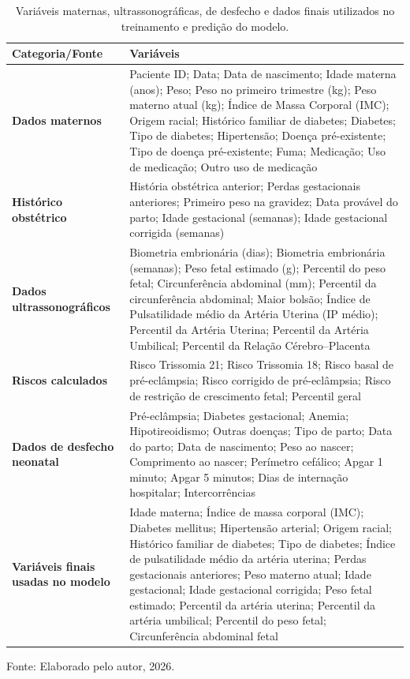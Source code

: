 \documentclass[12pt, a4paper]{report}
\theoremstyle{definition}
\theoremstyle{remark}
\theoremstyle{plain}
\begin{document}
\begin{table}[H]
\centering
\caption{Variáveis maternas, ultrassonográficas, de desfecho e dados finais utilizados no treinamento e predição do modelo.}
\small

\begin{tabularx}{\textwidth}{
  >{\RaggedRight\arraybackslash}p{3.5cm}
  >{\RaggedRight\arraybackslash}X
}
\hline
\textbf{Categoria/Fonte} & \textbf{Variáveis} \\
\hline

\textbf{Dados maternos} &
Paciente ID; Data; Data de nascimento; Idade materna (anos); Peso; Peso no primeiro trimestre (kg);
Peso materno atual (kg); Índice de Massa Corporal (IMC); Origem racial; 
Histórico familiar de diabetes; Diabetes; Tipo de diabetes; Hipertensão; 
Doença pré-existente; Tipo de doença pré-existente; Fuma; Medicação; Uso de medicação; Outro uso de medicação \\
\hline

\textbf{Histórico obstétrico} &
História obstétrica anterior; Perdas gestacionais anteriores; 
Primeiro peso na gravidez; Data provável do parto; Idade gestacional (semanas); 
Idade gestacional corrigida (semanas) \\
\hline

\textbf{Dados ultrassonográficos} &
Biometria embrionária (dias); Biometria embrionária (semanas);
Peso fetal estimado (g); Percentil do peso fetal;
Circunferência abdominal (mm); Percentil da circunferência abdominal;
Maior bolsão;
Índice de Pulsatilidade médio da Artéria Uterina (IP médio);
Percentil da Artéria Uterina;
Percentil da Artéria Umbilical;
Percentil da Relação Cérebro--Placenta \\
\hline

\textbf{Riscos calculados} &
Risco Trissomia 21; Risco Trissomia 18;
Risco basal de pré-eclâmpsia; Risco corrigido de pré-eclâmpsia;
Risco de restrição de crescimento fetal; Percentil geral \\
\hline

\textbf{Dados de desfecho neonatal} &
Pré-eclâmpsia; Diabetes gestacional; Anemia; Hipotireoidismo; Outras doenças;
Tipo de parto; Data do parto; Data de nascimento;
Peso ao nascer; Comprimento ao nascer; Perímetro cefálico;
Apgar 1 minuto; Apgar 5 minutos;
Dias de internação hospitalar; Intercorrências \\
\hline

\textbf{Variáveis finais usadas no modelo} &
Idade materna; Índice de massa corporal (IMC); Diabetes mellitus;
Hipertensão arterial; Origem racial;
Histórico familiar de diabetes; Tipo de diabetes;
Índice de pulsatilidade médio da artéria uterina;
Perdas gestacionais anteriores; Peso materno atual;
Idade gestacional; Idade gestacional corrigida;
Peso fetal estimado; Percentil da artéria uterina;
Percentil da artéria umbilical; Percentil do peso fetal;
Circunferência abdominal fetal \\

\hline

\end{tabularx}

\vspace{2mm}
\footnotesize
Fonte: Elaborado pelo autor, 2026.
\end{table}
\end{document}
